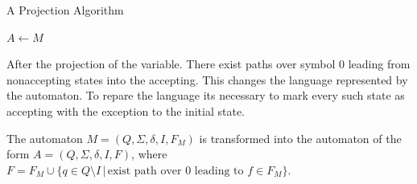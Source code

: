 \documentclass[pdflatex,sn-mathphys-num]{sn-jnl}%
\theoremstyle{thmstyleone}%
\theoremstyle{thmstyletwo}%
\theoremstyle{thmstylethree}%
\begin{document}
        \begin{algorithm}
            \caption{A Projection Algorithm}
            \small
            \DontPrintSemicolon

            \vspace*{0.5em}

            $A \leftarrow M$\;




        \end{algorithm}

        After the projection of the variable. There exist paths over symbol 0 leading from nonaccepting states into the accepting. This changes the language represented by the automaton. To repare the language its necessary to mark every such state as accepting with the exception to the initial state.

        The automaton $M = (Q, \Sigma, \delta, I, F_M)$ is transformed into the automaton of the form $A = (Q, \Sigma, \delta, I, F)$, where $F = F_M \cup \{q \in Q\setminus I\,|\, \text{exist path over 0 leading to } f \in F_M\}$.
\end{document}
